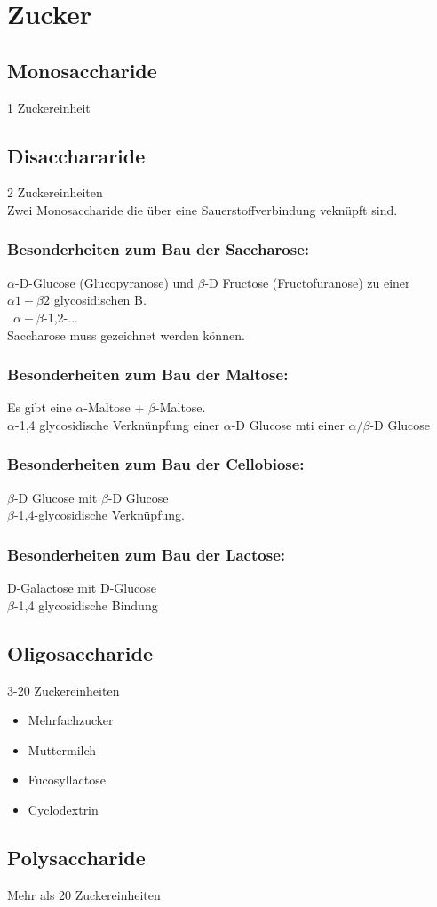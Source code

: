 \section{Zucker}

\subsection{Monosaccharide}
1 Zuckereinheit

\subsection{Disacchararide}
2 Zuckereinheiten \\
Zwei Monosaccharide die über eine Sauerstoffverbindung veknüpft sind.
\subsubsection{Besonderheiten zum Bau der Saccharose:}
$\alpha$-D-Glucose (Glucopyranose) und $\beta$-D Fructose (Fructofuranose) zu einer $\alpha 1 -\beta 2$ glycosidischen B. \\ 
\textrightarrow\ $\alpha-\beta$-1,2-... \\
Saccharose muss gezeichnet werden können.

\subsubsection{Besonderheiten zum Bau der Maltose:}
Es gibt eine $\alpha$-Maltose + $\beta$-Maltose. \\
$\alpha$-1,4 glycosidische Verknünpfung einer $\alpha$-D Glucose mti einer $\alpha/\beta$-D Glucose

\subsubsection{Besonderheiten zum Bau der Cellobiose:}
$\beta$-D Glucose mit $\beta$-D Glucose \\
$\beta$-1,4-glycosidische Verknüpfung.

\subsubsection{Besonderheiten zum Bau der Lactose:}
D-Galactose mit D-Glucose \\
$\beta$-1,4 glycosidische Bindung

\subsection{Oligosaccharide}
3-20 Zuckereinheiten
\begin{itemize}
    \item Mehrfachzucker
    \item Muttermilch
    \item Fucosyllactose
    \item Cyclodextrin
\end{itemize}

\subsection{Polysaccharide}
Mehr als 20 Zuckereinheiten

